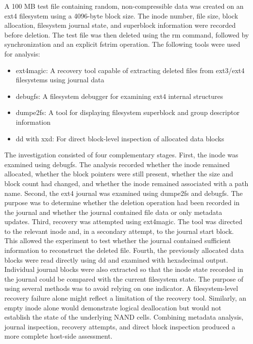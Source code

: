 A 100 MB test file containing random, non-compressible data was created on an ext4 filesystem using a 4096-byte block size. The inode number, file size, block 
allocation, filesystem journal state, and superblock information were recorded before deletion. The test file was then deleted using the rm command, followed by 
synchronization and an explicit fstrim operation. The following tools were used for analysis:

\begin{itemize}
    \item {ext4magic}: A recovery tool capable of extracting deleted files from ext3/ext4 filesystems using journal data

    \item {debugfs}: A filesystem debugger for examining ext4 internal structures

    \item {dumpe2fs}: A tool for displaying filesystem superblock and group descriptor information

    \item {dd with xxd}: For direct block-level inspection of allocated data blocks
\end{itemize}

The investigation consisted of four complementary stages.
First, the inode was examined using debugfs. The analysis recorded whether the inode remained allocated, whether the block pointers were still present, whether the size 
and block count had changed, and whether the inode remained associated with a path name. Second, the ext4 journal was examined using dumpe2fs and debugfs. The purpose was 
to determine whether the deletion operation had been recorded in the journal and whether the journal contained file data or only metadata updates. Third, recovery was 
attempted using ext4magic. The tool was directed to the relevant inode and, in a secondary attempt, to the journal start block. This allowed the experiment to test 
whether the journal contained sufficient information to reconstruct the deleted file. Fourth, the previously allocated data blocks were read directly using dd and 
examined with hexadecimal output. Individual journal blocks were also extracted so that the inode state recorded in the journal could be compared with the current 
filesystem state. The purpose of using several methods was to avoid relying on one indicator. A filesystem-level recovery failure alone might reflect a limitation of the 
recovery tool. Similarly, an empty inode alone would demonstrate logical deallocation but would not establish the state of the underlying NAND cells. Combining metadata 
analysis, journal inspection, recovery attempts, and direct block inspection produced a more complete host-side assessment.

